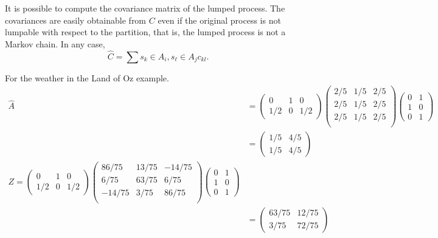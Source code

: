 \documentclass[12pt]{article}
\begin{document}
It is possible to compute the covariance matrix of the lumped process.
The covariances are easily obtainable from \( C \) even if the
original process is not lumpable with respect to the partition, that
is, the lumped process is not a Markov chain.  In any case,
\[
  \hat{C} = \sum{s_k \in A_i, s_{\ell} \in A_j } c_{kl}.
\]

\begin{example}
  For the weather in the Land of Oz example.
  \begin{align*}
   \hat{A} &=
    \begin{pmatrix}
      0 & 1 & 0 \\
      1/2 & 0 & 1/2
    \end{pmatrix}
    \begin{pmatrix}
      2/5 & 1/5 & 2/5 \\
      2/5 & 1/5 & 2/5 \\
      2/5 & 1/5 & 2/5 \\
    \end{pmatrix}
    \begin{pmatrix}
      0 & 1 \\
      1 & 0 \\
      0 & 1
    \end{pmatrix} \\
    & =
    \begin{pmatrix}
      1/5 & 4/5 \\
      1/5 & 4/5
    \end{pmatrix} \\
   Z =      \begin{pmatrix}
      0 & 1 & 0 \\
      1/2 & 0 & 1/2
    \end{pmatrix}
    \begin{pmatrix}
      86/75 & 13/75 & -14/75 \\
       6/75 & 63/75 &   6/75 \\
     -14/75  & 3/75 &  86/75 \\
    \end{pmatrix}
    \begin{pmatrix}
      0 & 1 \\
      1 & 0 \\
      0 & 1
    \end{pmatrix} \\
    & =
    \begin{pmatrix}
      63/75 & 12/75 \\
       3/75 & 72/75
    \end{pmatrix} \\

\end{align*}
\end{example}
\end{document}
